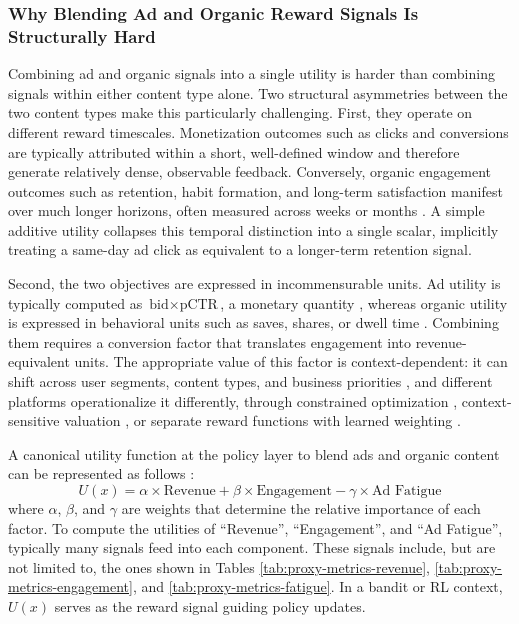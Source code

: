 \documentclass[manuscript,review,screen]{acmart}
\begin{document}
\subsubsection{Why Blending Ad and Organic Reward Signals Is Structurally Hard}

Combining ad and organic signals into a single utility is harder than combining signals within either content type alone. Two structural asymmetries between the two content types make this particularly challenging. First, they operate on different reward timescales. Monetization outcomes such as clicks and conversions are typically attributed within a short, well-defined window and therefore generate relatively dense, observable feedback. Conversely, organic engagement outcomes such as retention, habit formation, and long-term satisfaction manifest over much longer horizons, often measured across weeks or months \cite{hohnhold2015focusing, mcdonald2023impatient}. A simple additive utility collapses this temporal distinction into a single scalar, implicitly treating a same-day ad click as equivalent to a longer-term retention signal.

Second, the two objectives are expressed in incommensurable units. Ad utility is typically computed as $\text{bid} \times \text{pCTR}$, a monetary quantity \cite{yan2020ads, zhang2018whole}, whereas organic utility is expressed in behavioral units such as saves, shares, or dwell time \cite{wang2022surrogate, mcdonald2023impatient}. Combining them requires a conversion factor that translates engagement into revenue-equivalent units. The appropriate value of this factor is context-dependent: it can shift across user segments, content types, and business priorities \cite{hohnhold2015focusing}, and different platforms operationalize it differently, through constrained optimization \cite{yan2020ads}, context-sensitive valuation \cite{carrion2021blending}, or separate reward functions with learned weighting \cite{zhao2020jointly}. 

A canonical utility function at the policy layer to blend ads and organic content can be represented as follows \cite{sagtani2024ad, yan2020ads, carrion2021blending}:
{\setlength{\abovedisplayskip}{4pt}
\setlength{\belowdisplayskip}{4pt}
\setlength{\abovedisplayshortskip}{2pt}
\setlength{\belowdisplayshortskip}{2pt}
\[
U(x) = \alpha \times \text{Revenue} + \beta \times \text{Engagement} - \gamma \times \text{Ad Fatigue}
\]
}
where $\alpha$, $\beta$, and $\gamma$ are weights that determine the relative importance of each factor. To compute the utilities of ``Revenue'', ``Engagement'', and ``Ad Fatigue'', typically many signals feed into each component. These signals include, but are not limited to, the ones shown in Tables \ref{tab:proxy-metrics-revenue}, \ref{tab:proxy-metrics-engagement}, and \ref{tab:proxy-metrics-fatigue}. In a bandit or RL context, $U(x)$ serves as the reward signal guiding policy updates.
\end{document}
